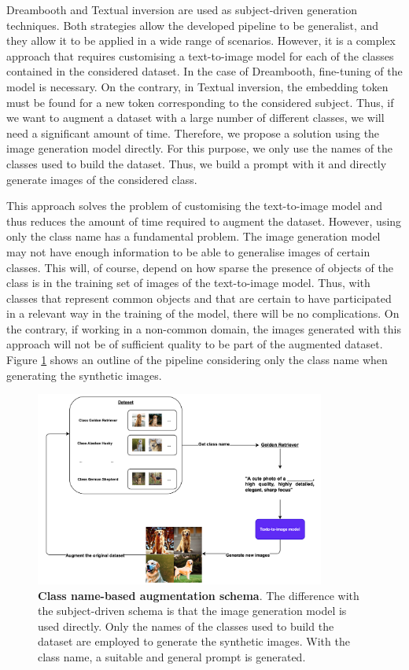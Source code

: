 Dreambooth and Textual inversion are used as subject-driven generation techniques. Both strategies allow the developed pipeline to be generalist, and they allow it to be applied in a wide range of scenarios. However, it is a complex approach that requires customising a text-to-image model for each of the classes contained in the considered dataset. In the case of Dreambooth, fine-tuning of the model is necessary. On the contrary, in Textual inversion, the embedding token must be found for a new token corresponding to the considered subject. Thus, if we want to augment a dataset with a large number of different classes, we will need a significant amount of time. Therefore, we propose a solution using the image generation model directly. For this purpose, we only use the names of the classes used to build the dataset. Thus, we build a prompt with it and directly generate images of the considered class.

This approach solves the problem of customising the text-to-image model and thus reduces the amount of time required to augment the dataset. However, using only the class name has a fundamental problem. The image generation model may not have enough information to be able to generalise images of certain classes. This will, of course, depend on how sparse the presence of objects of the class is in the training set of images of the text-to-image model. Thus, with classes that represent common objects and that are certain to have participated in a relevant way in the training of the model, there will be no complications. On the contrary, if working in a non-common domain, the images generated with this approach will not be of sufficient quality to be part of the augmented dataset. Figure \ref{fig:controlNetP} shows an outline of the pipeline considering only the class name when generating the synthetic images.

\begin{figure}
    \centering
    \includegraphics[width=0.85\textwidth]{Pictures/controlNetP.png} 
    \caption{\textbf{Class name-based augmentation schema}. The difference with the subject-driven schema is that the image generation model is used directly. Only the names of the classes used to build the dataset are employed to generate the synthetic images. With the class name, a suitable and general prompt is generated.}
    \label{fig:controlNetP}
\end{figure}

